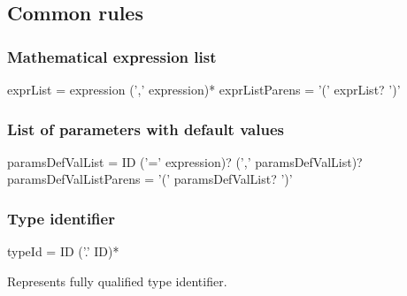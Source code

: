 \subsection{Common rules}

\subsubsection{Mathematical expression list}
\begin{Grammar}
exprList = expression (',' expression)*
exprListParens = '(' exprList? ')'
\end{Grammar}


\subsubsection{List of parameters with default values}
\begin{Grammar}
paramsDefValList = ID ('=' expression)?  (',' paramsDefValList)?
paramsDefValListParens = '(' paramsDefValList? ')'
\end{Grammar}


\subsubsection{Type identifier}
\begin{Grammar}
typeId = ID ('.' ID)*
\end{Grammar}

Represents fully qualified type identifier.









